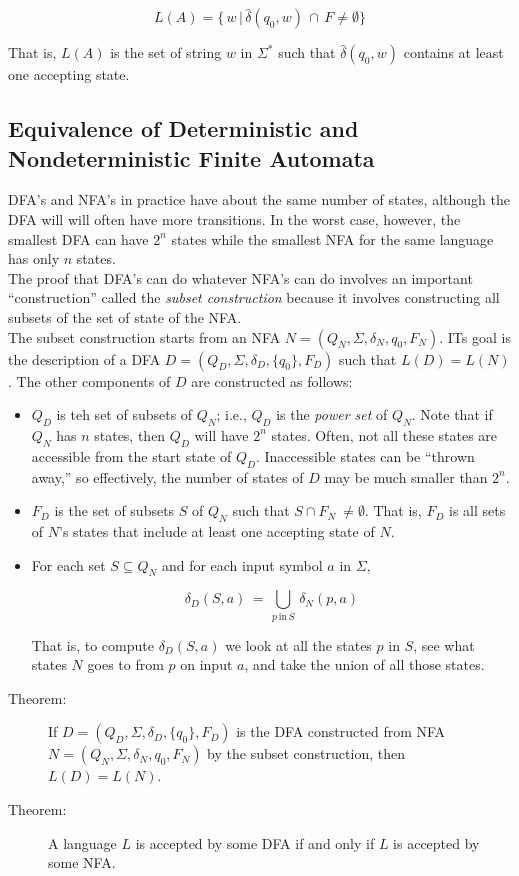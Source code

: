 \documentclass[]{article}
\begin{document}
      \[ 
        L(A) = \{ \, w \, | \, \hat{\delta}(q_0, w) \, \cap \, F \neq 
        \emptyset \} 
      \]
      
    That is, $L(A)$ is the set of string $w$ in $\Sigma^*$ such that $
    \hat{\delta}(q_0, w)$ contains at least one accepting state.
    
  \subsection*{Equivalence of Deterministic and Nondeterministic Finite 
  Automata}
    DFA's and NFA's in practice have about the same number of states, although 
    the DFA will will often have more transitions. In the worst case, however, 
    the smallest DFA can have $2^n$ states while the smallest NFA for the same
    language has only $n$ states. \\
    \indent The proof that DFA's can do whatever NFA's can do involves an 
    important ``construction'' called the \emph{subset construction} because 
    it involves constructing all subsets of the set of state of the NFA. \\
    \indent The subset construction starts from an NFA $N = (Q_N, \Sigma, 
    \delta_N, q_0, F_N)$. ITs goal is the description of a DFA $D = (Q_D, 
    \Sigma, \delta_D, \{q_0\}, F_D)$ such that $L(D) = L(N)$. The other 
    components of $D$ are constructed as follows:
      \begin{itemize}
        \item $Q_D$ is teh set of subsets of $Q_N$; i.e., $Q_D$ is the 
        \emph{power set} of $Q_N$. Note that if $Q_N$ has $n$ states, then 
        $Q_D$ will have $2^n$ states. Often, not all these states are 
        accessible from the start state of $Q_D$. Inaccessible states can be 
        ``thrown away,'' so effectively, the number of states of $D$ may be 
        much smaller than $2^n$.
        \item $F_D$ is the set of subsets $S$ of $Q_N$ such that $S \cap F_N \
        \neq \emptyset$. That is, $F_D$ is all sets of $N$'s states that 
        include at least one accepting state of $N$.
        \item For each set $S \subseteq Q_N$ and for each input symbol $a$ in 
        $\Sigma$,
        
          \[ 
            \delta_D(S, a) \, = \, \bigcup_{p \, \text{in} \, S} \, 
            \delta_N(p,a)
          \]
        
        That is, to compute $\delta_D(S,a)$ we look at all the states $p$ in 
        $S$, see what states $N$ goes to from $p$ on input $a$, and take the 
        union of all those states.
      \end{itemize}
      \begin{description}
        \item[Theorem:] If $D = (Q_D, \Sigma, \delta_D, \{q_0\}, F_D)$ is the 
        DFA constructed from NFA $N = (Q_N, \Sigma, \delta_N, q_0, F_N)$ by 
        the subset construction, then $L(D) = L(N)$.
        \item[Theorem:] A language $L$ is accepted by some DFA if and only if 
        $L$ is accepted by some NFA. 
      \end{description}
      
\end{document}

